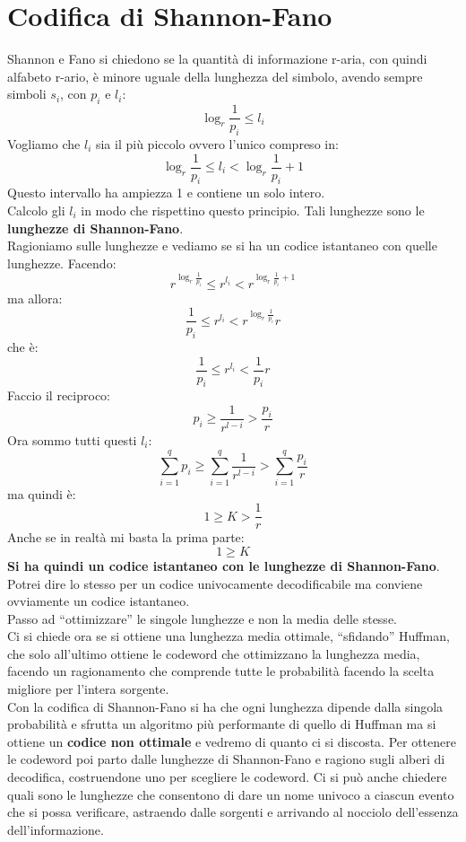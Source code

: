 \documentclass[a4paper,12pt, oneside]{book}
\begin{document}
\section{Codifica di Shannon-Fano}
Shannon e Fano si chiedono se la quantità di informazione r-aria, con quindi
alfabeto r-ario, è minore uguale
della lunghezza del simbolo, avendo sempre simboli $s_i$, con $p_i$ e $l_i$:
\[\log_r\frac{1}{p_i}\leq l_i\]
Vogliamo che $l_i$ sia il più piccolo ovvero l'unico compreso in:
\[\log_r \frac{1}{p_i}\leq l_i< \log_r\frac{1}{p_i}+1\]
Questo intervallo ha ampiezza 1 e contiene un solo intero.\\
Calcolo gli $l_i$ in modo che rispettino questo principio. Tali lunghezze sono
le \textbf{lunghezze di Shannon-Fano}.\\
Ragioniamo sulle lunghezze e vediamo se si ha un codice istantaneo con quelle
lunghezze. 
Facendo:
\[r^{\log_r \frac{1}{p_i}}\leq r^{ l_i}< r^{\log_r\frac{1}{p_i}+1}\]
ma allora:
\[ \frac{1}{p_i}\leq r^{l_i}< r^{\log_r\frac{1}{p_i}}r\]
che è:
\[ \frac{1}{p_i}\leq r^{l_i}< \frac{1}{p_i}r\]
Faccio il reciproco:
\[p_i\geq \frac{1}{r^{l-i}}> \frac{p_i}{r}\]
Ora sommo tutti questi $l_i$:
\[\sum_{i=1}^qp_i\geq \sum_{i=1}^q\frac{1}{r^{l-i}}>\sum_{i=1}^q \frac{p_i}{r}\]
ma quindi è:
\[1\geq K> \frac{1}{r}\]
Anche se in realtà mi basta la prima parte:
\[1\geq K\]
\textbf{Si ha quindi un codice istantaneo con le lunghezze di
  Shannon-Fano}. Potrei dire lo stesso per un codice univocamente decodificabile
ma conviene ovviamente un codice istantaneo.\\
Passo ad ``ottimizzare'' le singole lunghezze e non la media delle stesse.\\
Ci si chiede ora se si ottiene una lunghezza media ottimale, ``sfidando''
Huffman, che solo all'ultimo ottiene le codeword che ottimizzano la lunghezza
media, facendo un ragionamento che comprende tutte le probabilità facendo la
scelta migliore per l'intera sorgente.  \\
Con la codifica di Shannon-Fano si ha che ogni lunghezza dipende dalla singola
probabilità e sfrutta un algoritmo più performante di quello di Huffman ma si
ottiene un \textbf{codice non ottimale} e vedremo di quanto ci si discosta. Per
ottenere le codeword poi parto dalle lunghezze di Shannon-Fano e ragiono sugli
alberi di decodifica, costruendone uno per scegliere le codeword. Ci si può
anche chiedere quali sono le lunghezze che consentono di dare un nome univoco a
ciascun evento che si possa verificare, astraendo dalle sorgenti e arrivando al
nocciolo dell'essenza dell'informazione. \\
\end{document}
